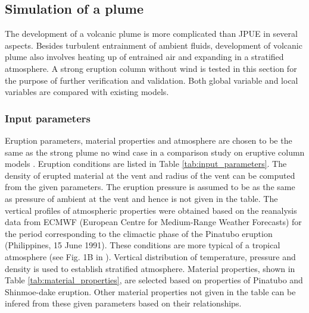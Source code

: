 \documentclass[journal abbreviation, manuscript]{copernicus}
\begin{document}
\subsection{Simulation of a plume}
The development of a volcanic plume is more complicated than JPUE in several aspects. Besides turbulent entrainment of ambient fluids, development of volcanic plume also involves heating up of entrained air and expanding in a stratified atmosphere. A strong eruption column without wind is tested in this section for the purpose of further verification and validation.
Both global variable and local variables are compared with existing models.

\subsubsection{Input parameters}
Eruption parameters, material properties and atmosphere are chosen to be the same as the strong plume no wind case in a comparison study on eruptive column models \citep{costa2016results}. Eruption conditions are listed in Table \ref{tab:input_parameters}. The density of erupted material at the vent and radius of the vent can be computed from the given parameters. The eruption pressure is assumed to be as the same as pressure of ambient at the vent and hence is not given in the table. The vertical profiles of atmospheric properties were obtained based on the reanalysis data from ECMWF (European Centre for Medium-Range Weather Forecasts) for the period corresponding to the climactic phase of the Pinatubo eruption (Philippines, 15 June 1991). These conditions are more typical of a tropical atmosphere (see Fig. 1B in \citep{costa2016results}). 
Vertical distribution of temperature, pressure and density is used to establish stratified atmosphere. Material properties, shown in Table \ref{tab:material_properties}, are selected based on properties of Pinatubo and Shinmoe-dake eruption. Other material properties not given in the table can be infered from these given parameters based on their relationships.
\end{document}
